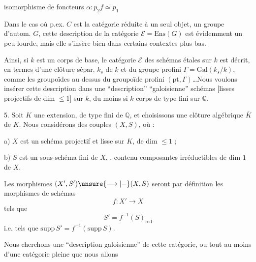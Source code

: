 isomorphisme de foncteurs $\alpha:p_2f\simeq p_1$

Dans le cas où p.ex. $C$ est la catégorie réduite à un seul objet, un groupe d'autom. $G$, cette description de la catégorie $\mathcal E=\mathrm{Ens}(G)$ est évidemment un peu lourde, mais elle s'insère bien dans certains contextes plus bas.

Ainsi, si $k$ est un corps de base, le  catégorie $\mathcal E$ des schémas étales sur $k$ est décrit, en termes d'une clôture sépar.  $k_s$ de $k$ et du groupe profini $\Gamma=\mathrm{Gal}(k_s/k)$, comme les groupoïdes  au dessus du groupoïde profini $(\mathrm{pt},\Gamma)$\dots Nous voulons insérer cette description dans une ``description'' ``galoisienne''  \inserted{[certains]} schémas [lisses projectifs de dim $\leq 1$] sur $k$, du moins si $k$ corps de type fini sur $\mathbb Q$.



5. Soit $K$ une extension, de type fini de $\mathbb Q$, et choisissons une clôture algébrique $\overline K$ de $K$.
 Nous considérons des couples $(X,S)$, où : 

a) $X$ est un schéma projectif et lisse sur $K$, de dim $\leq 1$ ;

b) $S$ est un sous-schéma fini  de $X$, , contenu     composantes irréductibles de dim $1$ de $X$.

Les morphismes $(X',S')\unsure{\longrightarrow|-}(X,S)$ seront par définition les morphismes de schémas
\[
f:X'\longrightarrow X
\]
tels que
\[
S'=f^{-1}(S)_{\mathrm{red}}
\]
i.e. tels que $\mathrm{supp}\,S'=f^{-1}(\mathrm{supp}\,S)$.

Nous cherchons une ``description galoisienne'' de cette catégorie, ou tout au moins d'une catégorie pleine  que nous allons

